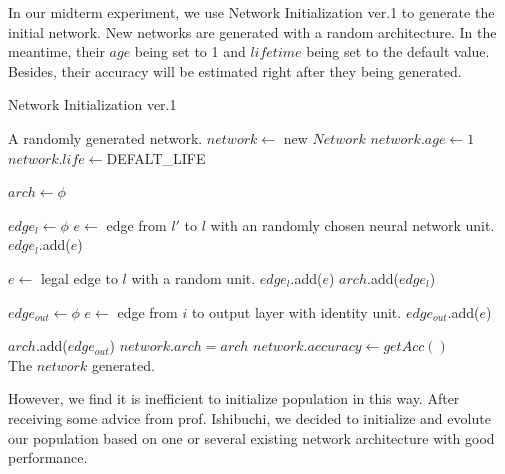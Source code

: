 \documentclass[conference]{IEEEtran}
\begin{document}
In our midterm experiment, we use Network Initialization ver.1 to generate the initial network. New networks are generated with a random architecture. In the meantime, their $age $ being set to 1 and $lifetime$ being set to the default value. Besides, their accuracy will be estimated right after they being generated.
 \begin{algorithm}[H]  
    \caption{ Network Initialization ver.1}
    
    
    \begin{algorithmic}[1]  
        \Ensure A randomly generated network.
    \State $network\gets $ new $Network$
    \State $network.age\gets1$
    \State $network.life\gets $DEFALT\_LIFE 
    
    \State $arch\gets \phi$

    \State $edge_l \gets \phi$
    \State $e \gets$ edge from $l'$ to $l$ with an randomly chosen neural network unit.
    \State $edge_l$.add($e$)
    \EndIf
        \EndFor

        \State  $e \gets$ legal edge to $l$ with a random unit.
        \State $edge_l$.add($e$)
        \EndIf
    \State $arch$.add($edge_l$)
        \EndFor
    
    \State $edge_{out} \gets \phi$
      \State $e \gets$ edge from $i$ to output layer with identity unit.
      \State $edge_{out}$.add($e$)
    \EndFor

    \State $arch$.add($edge_{out}$)
    \State $network.arch=arch$
    \State $network.accuracy\gets getAcc()$
    \\
        \Return The $network$ generated.
        
    \end{algorithmic}  
\end{algorithm}  


However, we find it is inefficient to initialize population in this way. After receiving some advice from prof. Ishibuchi, we decided to initialize and evolute our population based on one or several existing network architecture with good performance.
\end{document}
